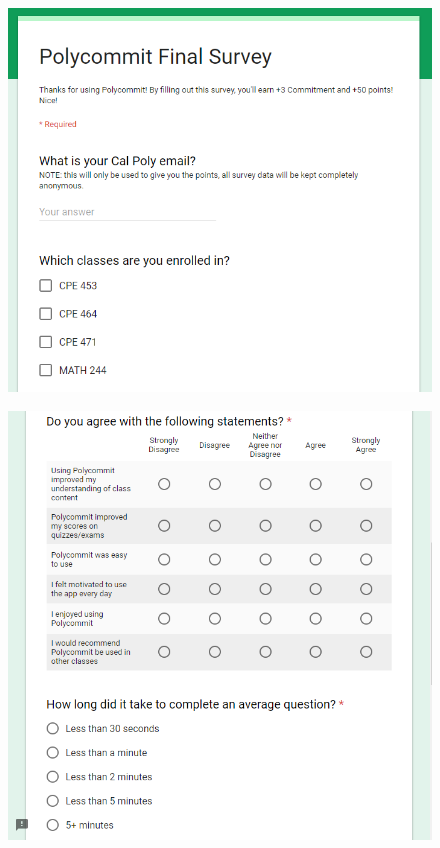 
\begin{figure}[h!]
	\includegraphics[width=1.0\linewidth]{figures/survey1}
	\caption{}
	\label{fig:survey1}
\end{figure}

\begin{figure}[h!]
	\includegraphics[width=1.0\linewidth]{figures/survey2}
	\caption{}
	\label{fig:survey2}
\end{figure}


